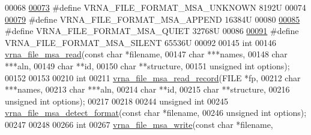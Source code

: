 \begin{DoxyCode}
00068 
\hyperlink{group__file__formats__msa_gabdc948f547e550125de3e7c65878400c}{00073} \textcolor{preprocessor}{#define VRNA\_FILE\_FORMAT\_MSA\_UNKNOWN      8192U}
00074 
\hyperlink{group__file__formats__msa_ga1577ea0f497d9c501549c863a4f2c089}{00079} \textcolor{preprocessor}{#define VRNA\_FILE\_FORMAT\_MSA\_APPEND       16384U}
00080 
\hyperlink{group__file__formats__msa_ga73aa3701a22c5acfcb2e8927287a0554}{00085} \textcolor{preprocessor}{#define VRNA\_FILE\_FORMAT\_MSA\_QUIET        32768U}
00086 
\hyperlink{group__file__formats__msa_gad98ca08968d19f221f29d2a1faf26887}{00091} \textcolor{preprocessor}{#define VRNA\_FILE\_FORMAT\_MSA\_SILENT       65536U}
00092 
00145 \textcolor{keywordtype}{int}
00146 \hyperlink{group__file__formats__msa_ga08a01c40ac5f5e0e04e9ae2258c99aa6}{vrna\_file\_msa\_read}(\textcolor{keyword}{const} \textcolor{keywordtype}{char}   *filename,
00147                    \textcolor{keywordtype}{char}         ***names,
00148                    \textcolor{keywordtype}{char}         ***aln,
00149                    \textcolor{keywordtype}{char}         **\textcolor{keywordtype}{id},
00150                    \textcolor{keywordtype}{char}         **structure,
00151                    \textcolor{keywordtype}{unsigned} \textcolor{keywordtype}{int} options);
00152 
00153 
00210 \textcolor{keywordtype}{int}
00211 \hyperlink{group__file__formats__msa_ga59204cd1daa4927f5127cc65a2886efd}{vrna\_file\_msa\_read\_record}(FILE          *fp,
00212                           \textcolor{keywordtype}{char}          ***names,
00213                           \textcolor{keywordtype}{char}          ***aln,
00214                           \textcolor{keywordtype}{char}          **\textcolor{keywordtype}{id},
00215                           \textcolor{keywordtype}{char}          **structure,
00216                           \textcolor{keywordtype}{unsigned} \textcolor{keywordtype}{int}  options);
00217 
00218 
00244 \textcolor{keywordtype}{unsigned} \textcolor{keywordtype}{int}
00245 \hyperlink{group__file__formats__msa_ga627ac281b5f11c63861726e6472626c9}{vrna\_file\_msa\_detect\_format}(\textcolor{keyword}{const} \textcolor{keywordtype}{char}    *filename,
00246                             \textcolor{keywordtype}{unsigned} \textcolor{keywordtype}{int}  options);
00247 
00248 
00266 \textcolor{keywordtype}{int}
00267 \hyperlink{group__file__formats__msa_ga0c90faf1515ce0b16620036b1055ff1e}{vrna\_file\_msa\_write}(\textcolor{keyword}{const} \textcolor{keywordtype}{char}    *filename,

\end{DoxyCode}
